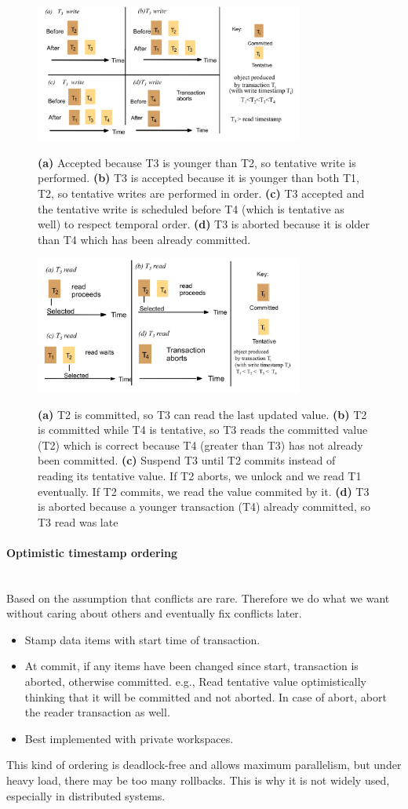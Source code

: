 \documentclass[10pt,a4paper]{article}
\newcommand{\myparagraph}[1]{\paragraph{#1}\mbox{}\\[0.05in]}
\begin{document}
\begin{figure}[h!]
\hfill \includegraphics[width=250pt]{images/write-op.png}\hspace*{\fill}
  \label{fig:write-op}
  \caption{\textbf{(a)} Accepted because T3 is younger than T2, so tentative write is performed. \textbf{(b)} T3 is accepted because it is younger than both T1, T2, so tentative writes are performed in order. \textbf{(c)} T3 accepted and the tentative write is scheduled before T4 (which is tentative as well) to respect  temporal order. \textbf{(d)} T3 is aborted because it is older than T4 which has been already committed.}
\end{figure}
\begin{figure}[h!]
\hfill \includegraphics[width=250pt]{images/read-op.png}\hspace*{\fill}
  \label{fig:read-op}
  \caption{\textbf{(a)} T2 is committed, so T3 can read the last updated value. \textbf{(b)} T2 is committed while T4 is tentative, so T3 reads the committed value (T2) which is correct because T4 (greater than T3) has not already been committed. \textbf{(c)} Suspend T3 until T2 commits instead of reading its tentative value. If T2 aborts, we unlock and we read T1 eventually. If T2 commits, we read the value commited by it. \textbf{(d)} T3 is aborted because a younger transaction (T4) already committed, so T3 read was late}
\end{figure}
\myparagraph{Optimistic timestamp ordering}
Based on the assumption that conflicts are rare. Therefore we do what we want without caring about others and eventually fix conflicts later.
\begin{itemize}
	\item Stamp data items with start time of transaction.
	\item At commit, if any items have been changed since start, transaction is aborted, otherwise committed. e.g., Read tentative value optimistically thinking that it will be committed and not aborted. In case of abort, abort the reader transaction as well.
	\item Best implemented with private workspaces.
\end{itemize}
This kind of ordering is deadlock-free and allows maximum parallelism, but under heavy load, there may be too many rollbacks. This is why it is not widely used, especially in distributed systems.
\end{document}
